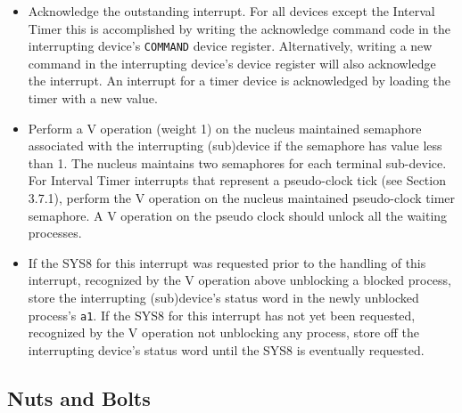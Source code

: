 \begin{itemize}
	\item Acknowledge the outstanding interrupt. For all devices except the Interval Timer
	this is accomplished by writing the acknowledge command code in the interrupting device's \verb+COMMAND+ device register. Alternatively, writing a new command in
	the interrupting device's device register will also acknowledge the interrupt.
	An interrupt for a timer device is acknowledged by loading the timer with a
	new value.
	\item Perform a V operation (weight 1) on the nucleus maintained semaphore associated
	with the interrupting (sub)device if the semaphore has value less than 1. The nucleus maintains two semaphores
	for each terminal sub-device. For Interval Timer interrupts that represent a
	pseudo-clock tick (see Section 3.7.1), perform the V operation on the nucleus maintained pseudo-clock timer semaphore.
	A V operation on the pseudo clock should unlock all the waiting processes.
	\item If the SYS8 for this interrupt was requested prior to the handling of this
	interrupt, recognized by the V operation above unblocking a blocked process, store the interrupting (sub)device's status word in the newly unblocked
	process's \verb+a1+. If the SYS8 for this interrupt has not yet been requested,
	recognized by the V operation not unblocking any process, store off the
	interrupting device's status word until the SYS8 is eventually requested.
\end{itemize}
\subsection{Nuts and Bolts}
